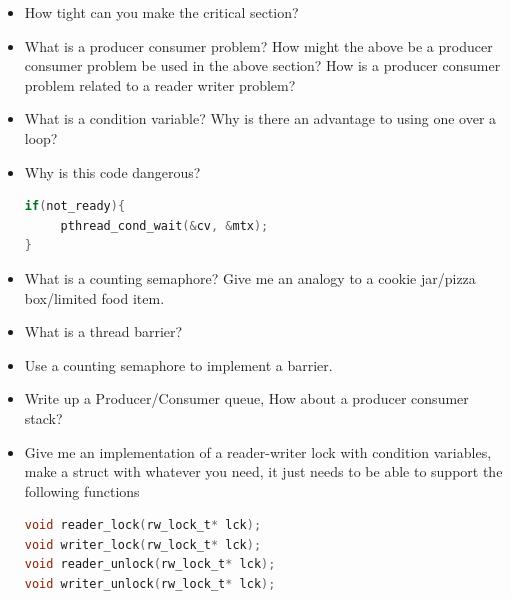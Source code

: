 \begin{itemize}
\item How tight can you make the critical section? 
\item What is a producer consumer problem? How might the above be a producer consumer problem be used in the above section? How is a producer consumer problem related to a reader writer problem? 
\item What is a condition variable? Why is there an advantage to using one over a  loop? 
\item Why is this code dangerous?

\begin{lstlisting}[language=C]
if(not_ready){
     pthread_cond_wait(&cv, &mtx);
}
\end{lstlisting}

\item
  What is a counting semaphore? Give me an analogy to a cookie jar/pizza box/limited food item.
\item
  What is a thread barrier?
\item
  Use a counting semaphore to implement a barrier.
\item
  Write up a Producer/Consumer queue, How about a producer consumer stack?
\item
  Give me an implementation of a reader-writer lock with condition variables, make a struct with whatever you need, it just needs to be able to support the following functions

\begin{lstlisting}[language=C]
void reader_lock(rw_lock_t* lck);
void writer_lock(rw_lock_t* lck);
void reader_unlock(rw_lock_t* lck);
void writer_unlock(rw_lock_t* lck);
\end{lstlisting}


\end{itemize}

